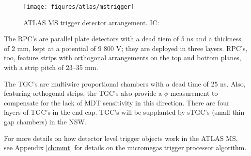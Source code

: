 \begin{figure}[!htbp]\captionsetup{justification=centering}
  \centering
  \texttt{[image: figures/atlas/mstrigger]}
  \caption{ATLAS MS trigger detector arrangement.  IC: \cite{jinstpaper}}
  \label{fig:mstrig}
\end{figure}

The RPC's are parallel plate detectors with a dead tiem of 5 ns and a thickness of 2 mm, kept at a potential of 9 800 V; they are deployed in three layers.  RPC's, too, feature strips with orthogonal arrangements on the top and bottom planes, with a strip pitch of 23--35 mm.  

The TGC's are multiwire proportional chambers with a dead time of 25 ns.  Also, featuring orthogonal strips, the TGC's also provide a $\phi$ measurement to compensate for the lack of MDT sensitivity in this direction.  There are four layers of TGC's in the end cap.  TGC's will be supplanted by sTGC's (small thin gap chambers) in the NSW.

For more details on how detector level trigger objects work in the ATLAS MS, see Appendix \ref{ch:mmt} for details on the micromegas trigger processor algorithm.

